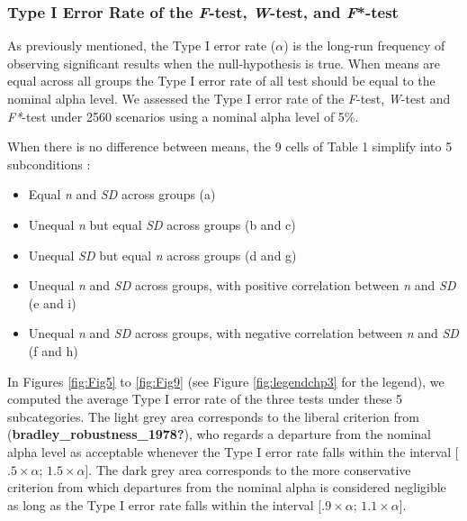 \documentclass[
  english,
  man]{apa6}
\providecommand{\tightlist}{%
  \setlength{\itemsep}{0pt}\setlength{\parskip}{0pt}}
\begin{document}
\hypertarget{type-i-error-rate-of-the-f-test-w-test-and-f-test}{%
\subsubsection{\texorpdfstring{Type I Error Rate of the \emph{F}-test, \emph{W}-test, and \emph{F}*-test}{Type I Error Rate of the F-test, W-test, and F*-test}}\label{type-i-error-rate-of-the-f-test-w-test-and-f-test}}

As previously mentioned, the Type I error rate (\(\alpha\)) is the long-run frequency of observing significant results when the null-hypothesis is true. When means are equal across all groups the Type I error rate of all test should be equal to the nominal alpha level. We assessed the Type I error rate of the \emph{F}-test, \emph{W}-test and \emph{F*}-test under 2560 scenarios using a nominal alpha level of 5\(\%\).

When there is no difference between means, the 9 cells of Table 1 simplify into 5 subconditions :

\begin{itemize}
\tightlist
\item
  Equal \emph{n} and \emph{SD} across groups (a)\\
\item
  Unequal \emph{n} but equal \emph{SD} across groups (b and c)\\
\item
  Unequal \emph{SD} but equal \emph{n} across groups (d and g)\\
\item
  Unequal \emph{n} and \emph{SD} across groups, with positive correlation between \emph{n} and \emph{SD} (e and i)\\
\item
  Unequal \emph{n} and \emph{SD} across groups, with negative correlation between \emph{n} and \emph{SD} (f and h)
\end{itemize}

In Figures \ref{fig:Fig5} to \ref{fig:Fig9} (see Figure \ref{fig:legendchp3} for the legend), we computed the average Type I error rate of the three tests under these 5 subcategories. The light grey area corresponds to the liberal criterion from (\textbf{bradley\_robustness\_1978?}), who regards a departure from the nominal alpha level as acceptable whenever the Type I error rate falls within the interval {[}\(.5 \times \alpha\); \(1.5 \times \alpha\){]}. The dark grey area corresponds to the more conservative criterion from which departures from the nominal alpha is considered negligible as long as the Type I error rate falls within the interval {[}\(.9 \times \alpha\); \(1.1 \times \alpha\){]}.
\end{document}
